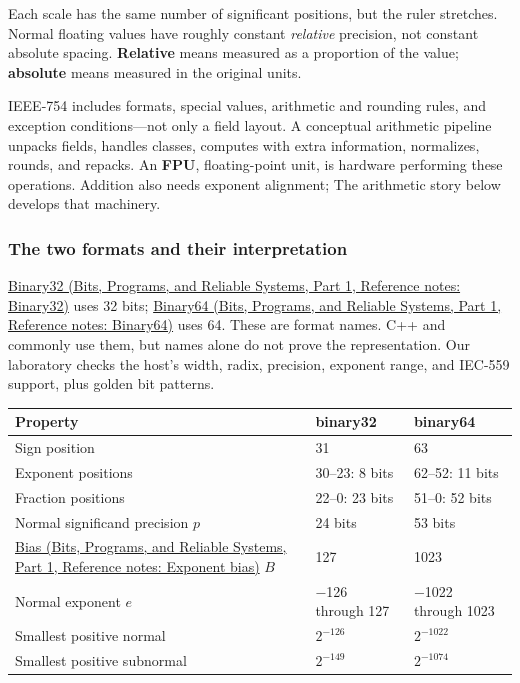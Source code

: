 Each scale has the same number of significant positions, but the ruler stretches. Normal floating values have roughly constant \emph{relative} precision, not constant absolute spacing. \textbf{Relative} means measured as a proportion of the value; \textbf{absolute} means measured in the original units.

IEEE-754 includes formats, special values, arithmetic and rounding rules, and exception conditions---not only a field layout. A conceptual arithmetic pipeline unpacks fields, handles classes, computes with extra information, normalizes, rounds, and repacks. An \textbf{FPU}, floating-point unit, is hardware performing these operations. Addition also needs exponent alignment; The arithmetic story below develops that machinery.

\subsubsection{The two formats and their interpretation}\label{05-engine-i-ch001-the-two-formats-and-their-interpretation}

\hypertarget{05-engine-i-ch001-the-two-formats-and-their-interpretation}{}

\href{../01-Bits-Programs-and-Reliable-Systems-P01/main.pdf\#nameddest=appendix-5057f9ad327f}{Binary32 (Bits, Programs, and Reliable Systems, Part 1, Reference notes: Binary32)} uses 32 bits; \href{../01-Bits-Programs-and-Reliable-Systems-P01/main.pdf\#nameddest=appendix-5078dfab64e6}{Binary64 (Bits, Programs, and Reliable Systems, Part 1, Reference notes: Binary64)} uses 64. These are format names. C++  and  commonly use them, but names alone do not prove the representation. Our laboratory checks the host's width, radix, precision, exponent range, and IEC-559 support, plus golden bit patterns.

{\def\LTcaptype{none} %
\begin{longtable}[]{@{}lll@{}}
\toprule\noalign{}
Property & binary32 & binary64 \\
\midrule\noalign{}
\endhead
\bottomrule\noalign{}
\endlastfoot
Sign position & 31 & 63 \\
Exponent positions & 30--23: 8 bits & 62--52: 11 bits \\
Fraction positions & 22--0: 23 bits & 51--0: 52 bits \\
Normal significand precision \(p\) & 24 bits & 53 bits \\
\href{../01-Bits-Programs-and-Reliable-Systems-P01/main.pdf\#nameddest=appendix-2fae058c82e1}{Bias (Bits, Programs, and Reliable Systems, Part 1, Reference notes: Exponent bias)} \(B\) & 127 & 1023 \\
Normal exponent \(e\) & −126 through 127 & −1022 through 1023 \\
Smallest positive normal & \(2^{-126}\) & \(2^{-1022}\) \\
Smallest positive subnormal & \(2^{-149}\) & \(2^{-1074}\) \\
\end{longtable}
}

